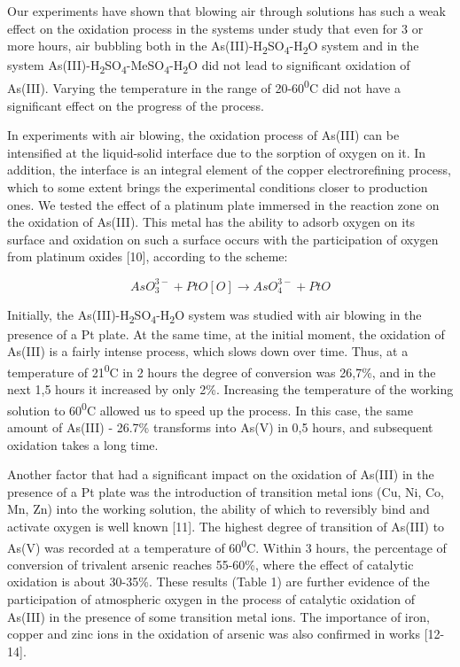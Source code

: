\begin{multicols}{2}
Our experiments have shown that blowing air through solutions has such a
weak effect on the oxidation process in the systems under study that
even for 3 or more hours, air bubbling both in the
As(III)-H\textsubscript{2}SO\textsubscript{4}-H\textsubscript{2}O system
and in the system
As(III)-H\textsubscript{2}SO\textsubscript{4}-MeSO\textsubscript{4}-H\textsubscript{2}O
did not lead to significant oxidation of As(III). Varying the
temperature in the range of 20-60\textsuperscript{0}C did not have a
significant effect on the progress of the process.

In experiments with air blowing, the oxidation process of As(III) can be
intensified at the liquid-solid interface due to the sorption of oxygen
on it. In addition, the interface is an integral element of the copper
electrorefining process, which to some extent brings the experimental
conditions closer to production ones. We tested the effect of a platinum
plate immersed in the reaction zone on the oxidation of As(III). This
metal has the ability to adsorb oxygen on its surface and oxidation on
such a surface occurs with the participation of oxygen from platinum
oxides {[}10{]}, according to the scheme:

\begin{equation*}
    AsO_3^{3-}+PtO[O]\rightarrow AsO_4^{3-}+PtO
\end{equation*}

Initially, the
As(III)-H\textsubscript{2}SO\textsubscript{4}-H\textsubscript{2}O system
was studied with air blowing in the presence of a Pt plate. At the same
time, at the initial moment, the oxidation of As(III) is a fairly
intense process, which slows down over time. Thus, at a temperature of
21\textsuperscript{0}C in 2 hours the degree of conversion was 26,7\%,
and in the next 1,5 hours it increased by only 2\%. Increasing the
temperature of the working solution to 60\textsuperscript{0}C allowed us
to speed up the process. In this case, the same amount of As(III) -
26.7\% transforms into As(V) in 0,5 hours, and subsequent oxidation
takes a long time.

Another factor that had a significant impact on the oxidation of As(III)
in the presence of a Pt plate was the introduction of transition metal
ions (Cu, Ni, Co, Mn, Zn) into the working solution, the ability of
which to reversibly bind and activate oxygen is well known {[}11{]}. The
highest degree of transition of As(III) to As(V) was recorded at a
temperature of 60\textsuperscript{0}C. Within 3 hours, the percentage of
conversion of trivalent arsenic reaches 55-60\%, where the effect of
catalytic oxidation is about 30-35\%. These results (Table 1) are
further evidence of the participation of atmospheric oxygen in the
process of catalytic oxidation of As(III) in the presence of some
transition metal ions. The importance of iron, copper and zinc ions in
the oxidation of arsenic was also confirmed in works {[}12-14{]}.


\end{multicols}
